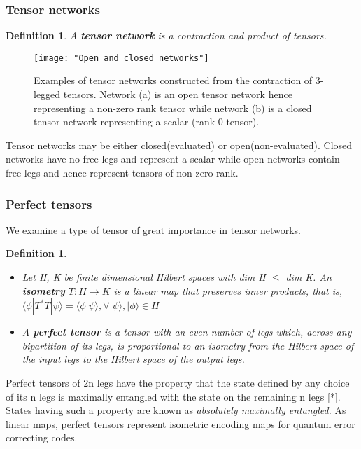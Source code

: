 \documentclass[11pt]{beamer}
\newcommand{\vs}{\vskip10pt}
\newtheorem{defn}[theorem]{Definition}
\begin{document}
\begin{frame}
	
	\frametitle{Tensor networks}
	
		\begin{defn}
		
		A \textbf{tensor network} is a contraction and product of tensors. 
	\end{defn}	

\begin{figure}
	\centering
	\texttt{[image: "Open and closed networks"]}
	\caption{Examples of tensor networks constructed from the contraction of 3-legged tensors. Network (a) is an open tensor network hence representing a non-zero rank tensor while network (b) is a closed tensor network representing a scalar (rank-0 tensor).}
	\label{fig:open-and-closed-networks}
\end{figure}
	
	Tensor networks may be either closed(evaluated) or open(non-evaluated). Closed networks have no free legs and represent a scalar while open networks contain free legs and hence represent tensors of non-zero rank. 
	
\end{frame}

\begin{frame} 
	
	\frametitle{Perfect tensors}
	
	We examine a type of tensor of great importance in tensor networks.
	
	\begin{defn}
		
		\begin{itemize}
		\item Let H, K be finite dimensional Hilbert spaces with dim H $ \leq $ dim K. An \textbf{isometry} $T: H \rightarrow K $ is a linear map that preserves inner products, that is, $ \langle \phi | T^*T | \psi \rangle = \langle \phi | \psi \rangle , \forall | \psi \rangle, | \phi \rangle \in H $
		\item A \textbf{perfect tensor} is a tensor with an even number of legs which, across any bipartition of its legs, is proportional to an isometry from the Hilbert space of the input legs to the Hilbert space of the output legs. 
		\end{itemize}
	\end{defn}
	\vs
	Perfect tensors of 2n legs have the property that the state defined by any choice of its n legs is maximally entangled with the state on the remaining n legs [*]. States having such a property are known as \textit{absolutely maximally entangled.} As linear maps, perfect tensors represent isometric encoding maps for quantum error correcting codes.
	
\end{frame}
\end{document}
